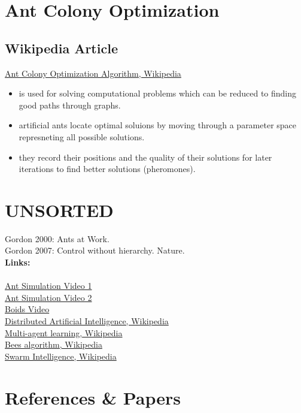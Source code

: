 \section{Ant Colony Optimization}
\subsection{Wikipedia Article}
\href{https://en.wikipedia.org/wiki/Ant_colony_optimization_algorithms}{Ant Colony Optimization Algorithm, Wikipedia}
\begin{itemize}[noitemsep,nolistsep]
	\item is used for solving computational problems which can be reduced to finding good paths through graphs.
	\item artificial ants locate optimal soluions by moving through a parameter space represneting all possible solutions.
	\item they record their positions and the quality of their solutions for later iterations to find better solutions (pheromones).
\end{itemize}

\section{UNSORTED}
Gordon 2000: Ants at Work.
\\
Gordon 2007: Control without hierarchy. Nature.
\\\textbf{Links:}\\
\\
\href{https://www.youtube.com/watch?v=X-iSQQgOd1A}{Ant Simulation Video 1}
\\
\href{https://www.youtube.com/watch?v=81GQNPJip2Y}{Ant Simulation Video 2}
\\
\href{https://www.youtube.com/watch?v=bqtqltqcQhw}{Boids Video}
\\
\href{https://en.wikipedia.org/wiki/Distributed_artificial_intelligence}{Distributed Artificial Intelligence, Wikipedia}
\\
\href{https://en.wikipedia.org/wiki/Multi-agent_learning}{Multi-agent learning, Wikipedia}
\\
\href{https://en.wikipedia.org/wiki/Bees_algorithm}{Bees algorithm, Wikipedia}
\\
\href{https://en.wikipedia.org/wiki/Swarm_intelligence}{Swarm Intelligence, Wikipedia}


\section{References \& Papers}
